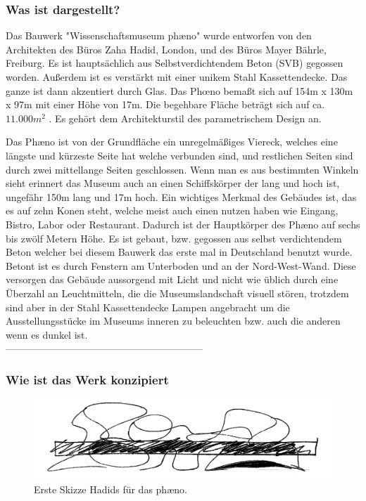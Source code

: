 \documentclass[a4paper]{article}
\begin{document}
\subsubsection{Was ist dargestellt?}
Das Bauwerk "Wissenschaftsmuseum phæno" wurde entworfen von den Architekten
des Büros Zaha Hadid, London, und des Büros Mayer Bährle, Freiburg.
Es ist hauptsächlich aus Selbstverdichtendem Beton (SVB) \cite{Fulcrum} gegossen worden.
Außerdem ist es verstärkt mit einer unikem Stahl Kassettendecke. Das ganze ist
dann akzentiert durch Glas. Das Phœno bemaßt sich auf 154m x 130m x 97m mit
einer Höhe von 17m. Die begehbare Fläche beträgt sich auf ca. $11.000m^{2}$
\cite{KoppJenal2006}. Es gehört dem Architekturstil des parametrischem Design
an.

Das Phæno ist von der Grundfläche ein unregelmäßiges Viereck, welches eine
längste und kürzeste Seite hat welche verbunden sind, und restlichen Seiten sind durch zwei
mittellange Seiten geschlossen. Wenn man es aus bestimmten Winkeln sieht
erinnert das Museum auch an einen Schiffskörper der lang und hoch ist, ungefähr
150m lang und 17m hoch. Ein wichtiges Merkmal des Gebäudes ist, das es
auf zehn Konen steht, welche meist auch einen nutzen haben wie Eingang, Bistro,
Labor oder Restaurant. Dadurch ist der Hauptkörper des Phæno auf sechs bis zwölf 
Metern Höhe. Es ist gebaut, bzw. gegossen aus selbst verdichtendem Beton welcher bei diesem
Bauwerk das erste mal in Deutschland benutzt wurde. Betont ist es durch
Fenstern am Unterboden und an der Nord-West-Wand. Diese versorgen das Gebäude
aussorgend mit Licht und nicht wie üblich durch eine Überzahl an Leuchtmitteln,
die die Museumslandschaft visuell stören, trotzdem sind aber in der Stahl
Kassettendecke Lampen angebracht um die Ausstellungsstücke im Museums inneren zu
beleuchten bzw. auch die anderen wenn es dunkel ist.
\\––––––––––––––––––––––––––––––––––––––––\\
\subsubsection{Wie ist das Werk konzipiert}

\begin{figure}[h]
\centering
\includegraphics[width=.5\linewidth]{paeno-sketch.jpg}
\caption{Erste Skizze Hadids für das phæno.\cite{article_creative_energy_sketches}}
\end{figure}
\end{document}
